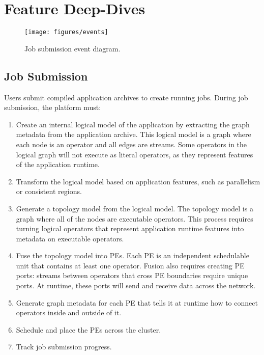 \section{Feature Deep-Dives}
\label{sec:features}

\begin{figure*}[t!]
    \centering
    \texttt{[image: figures/events]}
    \caption{Job submission event diagram.}
    \label{fig:submission}
\end{figure*}

\subsection{Job Submission}
\label{sec:jobsubmission}

Users submit compiled application archives to create running jobs.  During job
submission, the platform must:

\begin{enumerate}
    \item Create an internal logical model of the application by extracting the 
        graph metadata from the application archive. This logical model is a 
        graph where each node is an operator and all edges are streams. Some 
        operators in the logical graph will not execute as literal operators, 
        as they represent features of the application runtime.
    \item Transform the logical model based on application features, such as 
        parallelism or consistent regions.
    \item Generate a topology model from the logical model. The topology model is 
        a graph where all of the nodes are executable operators. This process
        requires turning logical operators that represent application runtime features 
        into metadata on executable operators.
    \item Fuse the topology model into PEs. Each PE is an independent 
        schedulable unit that contains at least one operator. Fusion also 
        requires creating PE ports: streams between operators that cross PE 
        boundaries require unique ports. At runtime, these ports will send and 
        receive data across the network.
    \item Generate graph metadata for each PE that tells it at runtime how 
        to connect operators inside and outside of it.
    \item Schedule and place the PEs across the cluster.
    \item Track job submission progress.
\end{enumerate}

